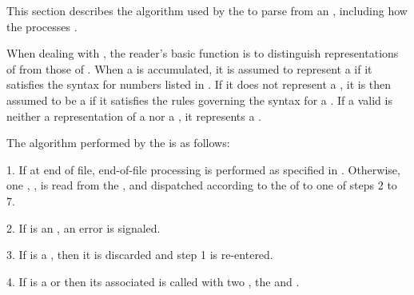
This section describes the algorithm used by the 
to parse  from an   ,
including how the  processes .

When dealing with , the reader's basic function is to distinguish
representations of  from those of .
When a  is accumulated, it is assumed to represent a  if it
satisfies the syntax for numbers listed in \figref\SyntaxForNumericTokens.
If it does not represent a ,
it is then assumed to be a  
if it satisfies the rules governing the syntax for a .
If a valid  is neither a representation of a  
			       nor a ,
it represents a .

The algorithm performed by the  is as follows:

\beginlist
\item{1.}            
If at end of file, end-of-file processing is performed as specified
in .
Otherwise,
one , ,  is read from the  , and
dispatched according to the  of  to one
of steps 2 to 7.

\item{2.}                                          
If  is an  ,
an error  is signaled.

\item{3.}
If  is a  ,
then it is discarded and step 1 is re-entered.

\item{4.}
If  is a  or  
then its associated  is called with two ,
the   and .

